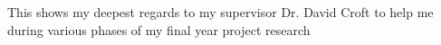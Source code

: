 This shows my deepest regards to my supervisor Dr. David Croft to help me during various phases of my final year project research
